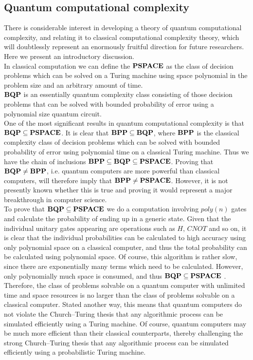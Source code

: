 \subsection{Quantum computational complexity}
There is considerable interest in developing a theory of quantum computational complexity, and relating it to classical computational complexity theory, which will doubtlessly represent an enormously fruitful direction for future researchers. Here we present an introductory discussion. \\
In classical computation we can define the $\bf{PSPACE}$ as the  class of decision problems which can be solved on a Turing machine using space polynomial in the problem size and an arbitrary amount of time. \\
$\bf{BQP}$ is an essentially quantum complexity class consisting of those decision problems that can be solved with bounded probability of error using a polynomial size quantum circuit. \\
One of the most significant results in quantum computational complexity is that $\bf{BQP} \subseteq \bf{PSPACE}$. It is clear that $\bf{BPP} \subseteq \bf{BQP}$, where $\bf{BPP}$ is the classical complexity class of decision problems which can be solved with bounded probability of error using polynomial time on a classical Turing machine. Thus we have the chain of inclusions $\bf{BPP} \subseteq \bf{BQP} \subseteq \bf{PSPACE}$. Proving that $\bf{BQP} \neq \bf{BPP}$, i.e. quantum computers are more powerful than classical computers, will therefore imply that $\bf{BPP} \neq \bf{PSPACE}$. However, it is not presently known whether this is true and proving it would represent a major breakthrough in computer science. \\
To prove that $\bf{BQP} \subseteq \bf{PSPACE}$ we do a computation involving $poly(n)$ gates and calculate the probability of ending up in a generic state. Given that the individual unitary gates appearing are operations such as $H$, $CNOT$ and so on, it is clear that the individual probabilities can be calculated to high accuracy using only polynomial space on a classical computer, and thus the total probability can be calculated using polynomial space. Of course, this algorithm is rather slow, since there are exponentially many terms which need to be calculated. However, only polynomially much space is consumed, and thus $\bf{BQP} \subseteq \bf{PSPACE}$ \cite{Nielsen2010Dec}. \\
Therefore, the class of problems solvable on a quantum computer with unlimited time and space resources is no larger than the class of problems solvable on a classical computer. Stated another way, this means that quantum computers do not violate the Church–Turing thesis that any algorithmic process can be simulated efficiently using a Turing machine. Of course, quantum computers may be much more efficient than their classical counterparts, thereby challenging the strong Church–Turing thesis that any algorithmic process can be simulated efficiently using a probabilistic Turing machine. \\
